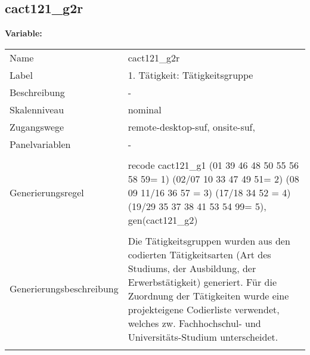 	
	
	\subsection{cact121\_g2r}
	\label{subSection:cact121_g2r}

	\noindent\textbf{Variable:}\\
		\begin{tabular}{lL{11.3cm}}
			\label{tableVariable:cact121_g2r}
			Name & cact121\_g2r \\
			Label & 1. Tätigkeit: Tätigkeitsgruppe  \\
			Beschreibung & - \\
			Skalenniveau & nominal \\
			Zugangswege &
				remote-desktop-suf,
				onsite-suf,
 \\
			Panelvariablen & -
			 \\
			 \\
					Generierungsregel & recode cact121\_g1  (01 39 46 48 50 55 56 58 59= 1)   (02/07 10 33 47 49 51= 2) (08 09 11/16 36 57 = 3) (17/18 34 52 = 4) (19/29 35 37 38 41 53 54 99= 5), gen(cact121\_g2) \\
				 \\
					Generierungsbeschreibung & Die Tätigkeitsgruppen wurden aus den codierten Tätigkeitsarten (Art des Studiums, der Ausbildung, der Erwerbstätigkeit) generiert. Für die Zuordnung der Tätigkeiten wurde eine projekteigene Codierliste verwendet, welches zw. Fachhochschul- und Universitäts-Studium unterscheidet.
				 \\	
			 \\
		\end{tabular}






